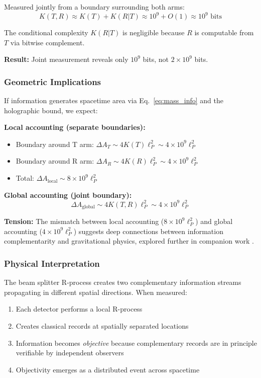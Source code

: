 ﻿\documentclass[12pt]{article}
\begin{document}
Measured jointly from a boundary surrounding both arms:
\begin{equation}
    K(T, R) \approx K(T) + K(R|T) \approx 10^9 + O(1) \approx 10^9 \text{ bits}
\end{equation}


The conditional complexity $K(R|T)$ is negligible because $R$ is computable 
from $T$ via bitwise complement.


\textbf{Result:} Joint measurement reveals only $10^9$ bits, not $2 \times 10^9$ bits.


\subsubsection{Geometric Implications}


If information generates spacetime area via Eq.~\ref{eq:mass_info} and the 
holographic bound, we expect:


\textbf{Local accounting (separate boundaries):}
\begin{itemize}
    \item Boundary around T arm: $\Delta A_T \sim 4K(T)\ell_P^2 \sim 4 \times 10^9 \ell_P^2$
    \item Boundary around R arm: $\Delta A_R \sim 4K(R)\ell_P^2 \sim 4 \times 10^9 \ell_P^2$
    \item Total: $\Delta A_{\text{local}} \sim 8 \times 10^9 \ell_P^2$
\end{itemize}


\textbf{Global accounting (joint boundary):}
\begin{equation}
    \Delta A_{\text{global}} \sim 4K(T,R)\ell_P^2 \sim 4 \times 10^9 \ell_P^2
\end{equation}


\textbf{Tension:} The mismatch between local accounting ($8 \times 10^9 \ell_P^2$) 
and global accounting ($4 \times 10^9 \ell_P^2$) suggests deep connections between 
information complementarity and gravitational physics, explored further in 
companion work \cite{reilly_mass_info}.


\subsubsection{Physical Interpretation}


The beam splitter R-process creates two complementary information streams 
propagating in different spatial directions. When measured:
\begin{enumerate}
    \item Each detector performs a local R-process
    \item Creates classical records at spatially separated locations  
    \item Information becomes \emph{objective} because complementary records 
          are in principle verifiable by independent observers
    \item Objectivity emerges as a distributed event across spacetime
\end{enumerate}
\end{document}
